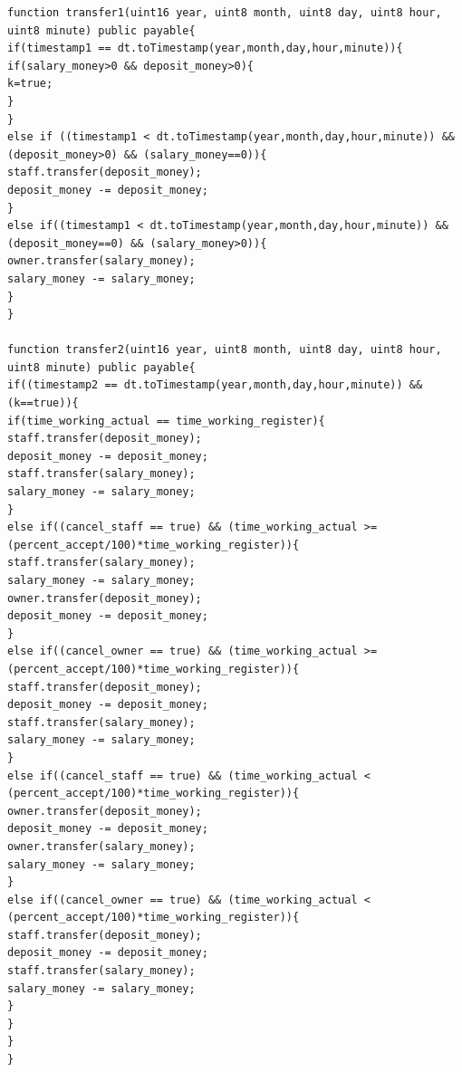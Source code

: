 \documentclass[12pt,a4paper,oneside]{article}
\begin{document}
\begin{lstlisting}
function transfer1(uint16 year, uint8 month, uint8 day, uint8 hour, uint8 minute) public payable{
if(timestamp1 == dt.toTimestamp(year,month,day,hour,minute)){
if(salary_money>0 && deposit_money>0){
k=true;
}
}
else if ((timestamp1 < dt.toTimestamp(year,month,day,hour,minute)) && (deposit_money>0) && (salary_money==0)){
staff.transfer(deposit_money);
deposit_money -= deposit_money;
}
else if((timestamp1 < dt.toTimestamp(year,month,day,hour,minute)) && (deposit_money==0) && (salary_money>0)){
owner.transfer(salary_money);
salary_money -= salary_money;
}
}

function transfer2(uint16 year, uint8 month, uint8 day, uint8 hour, uint8 minute) public payable{
if((timestamp2 == dt.toTimestamp(year,month,day,hour,minute)) && (k==true)){
if(time_working_actual == time_working_register){
staff.transfer(deposit_money);
deposit_money -= deposit_money;
staff.transfer(salary_money);
salary_money -= salary_money;
}
else if((cancel_staff == true) && (time_working_actual >= (percent_accept/100)*time_working_register)){
staff.transfer(salary_money);
salary_money -= salary_money;
owner.transfer(deposit_money);
deposit_money -= deposit_money;
}
else if((cancel_owner == true) && (time_working_actual >= (percent_accept/100)*time_working_register)){
staff.transfer(deposit_money);
deposit_money -= deposit_money;
staff.transfer(salary_money);	
salary_money -= salary_money;	
}
else if((cancel_staff == true) && (time_working_actual < (percent_accept/100)*time_working_register)){
owner.transfer(deposit_money);
deposit_money -= deposit_money;
owner.transfer(salary_money);
salary_money -= salary_money;	
}
else if((cancel_owner == true) && (time_working_actual < (percent_accept/100)*time_working_register)){
staff.transfer(deposit_money);
deposit_money -= deposit_money;
staff.transfer(salary_money);
salary_money -= salary_money;	
}
}
}
}

\end{lstlisting}
\end{document}
